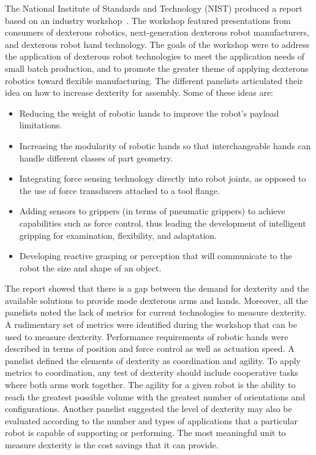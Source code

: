 The National Institute of Standards and Technology (NIST) produced a report based on an industry workshop~\cite{Falco.NISTIR.2013}. The workshop featured presentations from consumers of dexterous robotics, next-generation dexterous robot manufacturers, and dexterous robot hand technology. The goals of the workshop were to address the application of dexterous robot technologies to meet the application needs of small batch production, and to promote the greater theme of applying dexterous robotics toward flexible manufacturing. The different panelists articulated their idea on how to increase dexterity for assembly. Some of these ideas are:

\begin{itemize}
\item Reducing the weight of robotic hands to improve the robot's payload limitations.
\item Increasing the modularity of robotic hands so that interchangeable hands can handle different classes of part geometry.
\item Integrating force sensing technology directly into robot joints, as opposed to the use of force transducers attached to a tool flange.
\item Adding sensors to grippers (in terms of pneumatic grippers) to achieve capabilities such as force control, thus leading the development of intelligent gripping for examination, flexibility, and adaptation.
\item Developing reactive grasping or perception that will communicate to the robot the size and shape of an object.
\end{itemize}

The report showed that there is a gap between the demand for dexterity and the available solutions to provide mode dexterous arms and hands. Moreover, all the panelists noted the lack of metrics for current technologies to measure dexterity. A rudimentary set of metrics were identified during the workshop that can be used to measure dexterity. Performance requirements of robotic hands were described in terms of position and force control as well as actuation speed. A panelist defined the elements of dexterity as coordination and agility. To apply metrics to coordination, any test of dexterity should include cooperative tasks where both arms work together. The agility for a given robot is the ability to reach the greatest possible volume with the greatest number of orientations and configurations. Another panelist suggested the level of dexterity may also be evaluated according to the number and types of applications that a particular robot is capable of supporting or performing. The most meaningful unit to measure dexterity is the cost savings that it can provide.


